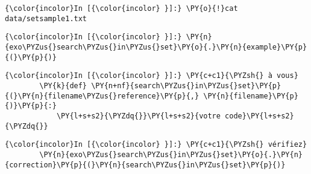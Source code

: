     \begin{Verbatim}[commandchars=\\\{\}]
{\color{incolor}In [{\color{incolor} }]:} \PY{o}{!}cat data/setsample1.txt
\end{Verbatim}


    \begin{Verbatim}[commandchars=\\\{\}]
{\color{incolor}In [{\color{incolor} }]:} \PY{n}{exo\PYZus{}search\PYZus{}in\PYZus{}set}\PY{o}{.}\PY{n}{example}\PY{p}{(}\PY{p}{)}
\end{Verbatim}


    \begin{Verbatim}[commandchars=\\\{\}]
{\color{incolor}In [{\color{incolor} }]:} \PY{c+c1}{\PYZsh{} à vous}
        \PY{k}{def} \PY{n+nf}{search\PYZus{}in\PYZus{}set}\PY{p}{(}\PY{n}{filename\PYZus{}reference}\PY{p}{,} \PY{n}{filename}\PY{p}{)}\PY{p}{:}
            \PY{l+s+s2}{\PYZdq{}}\PY{l+s+s2}{votre code}\PY{l+s+s2}{\PYZdq{}}
\end{Verbatim}


    \begin{Verbatim}[commandchars=\\\{\}]
{\color{incolor}In [{\color{incolor} }]:} \PY{c+c1}{\PYZsh{} vérifiez}
        \PY{n}{exo\PYZus{}search\PYZus{}in\PYZus{}set}\PY{o}{.}\PY{n}{correction}\PY{p}{(}\PY{n}{search\PYZus{}in\PYZus{}set}\PY{p}{)}
\end{Verbatim}